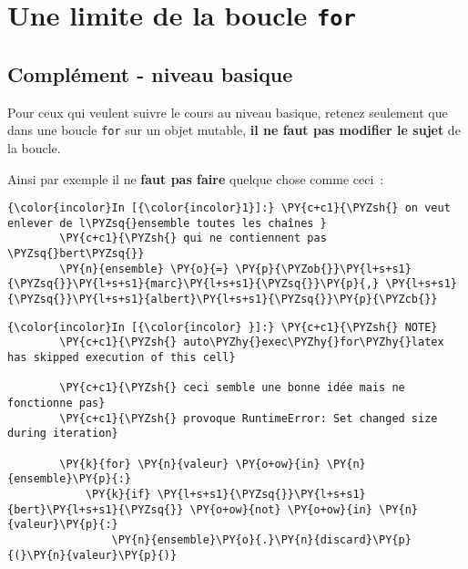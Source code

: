     
    
    
    

    

    \hypertarget{une-limite-de-la-boucle-for}{%
\section{\texorpdfstring{Une limite de la boucle
\texttt{for}}{Une limite de la boucle for}}\label{une-limite-de-la-boucle-for}}

    \hypertarget{compluxe9ment---niveau-basique}{%
\subsection{Complément - niveau
basique}\label{compluxe9ment---niveau-basique}}

    Pour ceux qui veulent suivre le cours au niveau basique, retenez
seulement que dans une boucle \texttt{for} sur un objet mutable,
\textbf{il ne faut pas modifier le sujet} de la boucle.

Ainsi par exemple il ne \textbf{faut pas faire} quelque chose comme
ceci~:

    \begin{Verbatim}[commandchars=\\\{\}]
{\color{incolor}In [{\color{incolor}1}]:} \PY{c+c1}{\PYZsh{} on veut enlever de l\PYZsq{}ensemble toutes les chaînes }
        \PY{c+c1}{\PYZsh{} qui ne contiennent pas \PYZsq{}bert\PYZsq{}}
        \PY{n}{ensemble} \PY{o}{=} \PY{p}{\PYZob{}}\PY{l+s+s1}{\PYZsq{}}\PY{l+s+s1}{marc}\PY{l+s+s1}{\PYZsq{}}\PY{p}{,} \PY{l+s+s1}{\PYZsq{}}\PY{l+s+s1}{albert}\PY{l+s+s1}{\PYZsq{}}\PY{p}{\PYZcb{}}
\end{Verbatim}


    \begin{Verbatim}[commandchars=\\\{\}]
{\color{incolor}In [{\color{incolor} }]:} \PY{c+c1}{\PYZsh{} NOTE}
        \PY{c+c1}{\PYZsh{} auto\PYZhy{}exec\PYZhy{}for\PYZhy{}latex has skipped execution of this cell}
        
        \PY{c+c1}{\PYZsh{} ceci semble une bonne idée mais ne fonctionne pas}
        \PY{c+c1}{\PYZsh{} provoque RuntimeError: Set changed size during iteration}
        
        \PY{k}{for} \PY{n}{valeur} \PY{o+ow}{in} \PY{n}{ensemble}\PY{p}{:}
            \PY{k}{if} \PY{l+s+s1}{\PYZsq{}}\PY{l+s+s1}{bert}\PY{l+s+s1}{\PYZsq{}} \PY{o+ow}{not} \PY{o+ow}{in} \PY{n}{valeur}\PY{p}{:}
                \PY{n}{ensemble}\PY{o}{.}\PY{n}{discard}\PY{p}{(}\PY{n}{valeur}\PY{p}{)}
\end{Verbatim}


